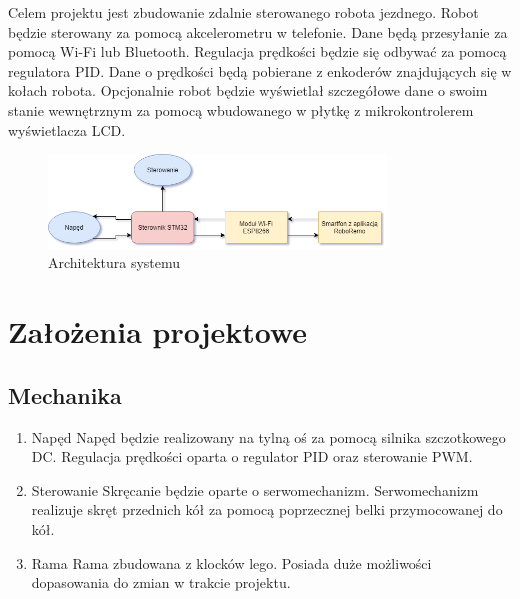 \documentclass[10pt, a4paper]{article}
\begin{document}
Celem projektu jest zbudowanie zdalnie sterowanego robota jezdnego. Robot będzie sterowany za pomocą akcelerometru w telefonie. Dane będą przesyłanie za pomocą Wi-Fi lub Bluetooth. Regulacja prędkości będzie się odbywać za pomocą regulatora PID. Dane o prędkości będą pobierane z enkoderów znajdujących się w kołach robota. Opcjonalnie robot będzie wyświetlał szczegółowe dane o swoim stanie wewnętrznym za pomocą wbudowanego w płytkę z mikrokontrolerem wyświetlacza LCD.
\newline
\newline

\begin{figure}[H]
	\centering
	\includegraphics[width=0.8\textwidth]{figures/diagram.png}
	\caption{Architektura systemu}
	\label{fig:Architektura}
\end{figure}

\section{Założenia projektowe}

	\subsection{Mechanika}
	\begin{enumerate}
		\item Napęd
		\newline
		Napęd będzie realizowany na tylną oś za pomocą silnika szczotkowego DC. Regulacja prędkości oparta o regulator PID oraz sterowanie PWM.
		
		\item Sterowanie
		\newline
		Skręcanie będzie oparte o serwomechanizm. Serwomechanizm realizuje skręt przednich kół za pomocą poprzecznej belki przymocowanej do kół.
		
		\item Rama
		\newline
		Rama zbudowana z klocków lego. Posiada duże możliwości dopasowania do zmian w trakcie projektu.
	\end{enumerate}
\end{document}
